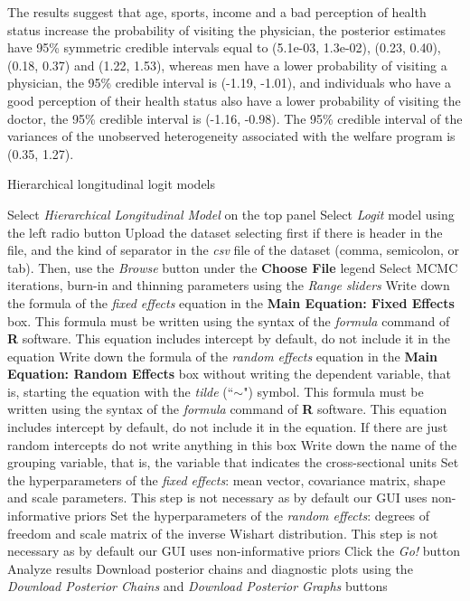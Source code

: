 The results suggest that age, sports, income and a bad perception of health status increase the probability of visiting the physician, the posterior estimates have 95\% symmetric credible intervals equal to (5.1e-03, 1.3e-02), (0.23, 0.40), (0.18, 0.37) and (1.22, 1.53), whereas men have a lower probability of visiting a physician, the 95\% credible interval is (-1.19, -1.01), and individuals who have a good perception of their health status also have a lower probability of visiting the doctor, the 95\% credible interval is (-1.16, -0.98). The 95\% credible interval of the variances of the unobserved heterogeneity associated with the welfare program is (0.35, 1.27).\\

\begin{algorithm}[h!]
	\caption{Hierarchical longitudinal logit models}\label{alg:HLogit}
	\begin{algorithmic}[1]  		 			
		\State Select \textit{Hierarchical Longitudinal Model} on the top panel
		\State Select \textit{Logit} model using the left radio button
		\State Upload the dataset selecting first if there is header in the file, and the kind of separator in the \textit{csv} file of the dataset (comma, semicolon, or tab). Then, use the \textit{Browse} button under the \textbf{Choose File} legend
		\State Select MCMC iterations, burn-in and thinning parameters using the \textit{Range sliders}
		\State Write down the formula of the \textit{fixed effects} equation in the \textbf{Main Equation: Fixed Effects} box. This formula must be written using the syntax of the \textit{formula} command of \textbf{R} software. This equation includes intercept by default, do not include it in the equation
		\State Write down the formula of the \textit{random effects} equation in the \textbf{Main Equation: Random Effects} box without writing the dependent variable, that is, starting the equation with the \textit{tilde} (``$\sim$") symbol. This formula must be written using the syntax of the \textit{formula} command of \textbf{R} software. This equation includes intercept by default, do not include it in the equation. If there are just random intercepts do not write anything in this box
		\State Write down the name of the grouping variable, that is, the variable that indicates the cross-sectional units 
		\State Set the hyperparameters of the \textit{fixed effects}: mean vector, covariance matrix, shape and scale parameters. This step is not necessary as by default our GUI uses non-informative priors
		\State Set the hyperparameters of the \textit{random effects}: degrees of freedom and scale matrix of the inverse Wishart distribution. This step is not necessary as by default our GUI uses non-informative priors
		\State Click the \textit{Go!} button
		\State Analyze results
		\State Download posterior chains and diagnostic plots using the \textit{Download Posterior Chains} and \textit{Download Posterior Graphs} buttons
	\end{algorithmic} 
\end{algorithm}

